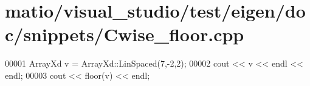 \hypertarget{matio_2visual__studio_2test_2eigen_2doc_2snippets_2_cwise__floor_8cpp_source}{}\section{matio/visual\+\_\+studio/test/eigen/doc/snippets/\+Cwise\+\_\+floor.cpp}
\label{matio_2visual__studio_2test_2eigen_2doc_2snippets_2_cwise__floor_8cpp_source}

\begin{DoxyCode}
00001 ArrayXd v = ArrayXd::LinSpaced(7,-2,2);
00002 cout << v << endl << endl;
00003 cout << floor(v) << endl;
\end{DoxyCode}
